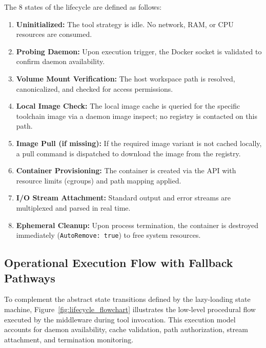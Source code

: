 The 8 states of the lifecycle are defined as follows:
\begin{enumerate}
    \item \textbf{Uninitialized:} The tool strategy is idle. No network, RAM, or CPU resources are consumed.
    \item \textbf{Probing Daemon:} Upon execution trigger, the Docker socket is validated to confirm daemon availability.
    \item \textbf{Volume Mount Verification:} The host workspace path is resolved, canonicalized, and checked for access permissions.
    \item \textbf{Local Image Check:} The local image cache is queried for the specific toolchain image via a daemon image inspect; no registry is contacted on this path.
    \item \textbf{Image Pull (if missing):} If the required image variant is not cached locally, a pull command is dispatched to download the image from the registry.
    \item \textbf{Container Provisioning:} The container is created via the API with resource limits (cgroups) and path mapping applied.
    \item \textbf{I/O Stream Attachment:} Standard output and error streams are multiplexed and parsed in real time.
    \item \textbf{Ephemeral Cleanup:} Upon process termination, the container is destroyed immediately (\texttt{AutoRemove: true}) to free system resources.
\end{enumerate}

\subsection{Operational Execution Flow with Fallback Pathways}
To complement the abstract state transitions defined by the lazy-loading state machine, Figure~\ref{fig:lifecycle_flowchart} illustrates the low-level procedural flow executed by the middleware during tool invocation. This execution model accounts for daemon availability, cache validation, path authorization, stream attachment, and termination monitoring.

